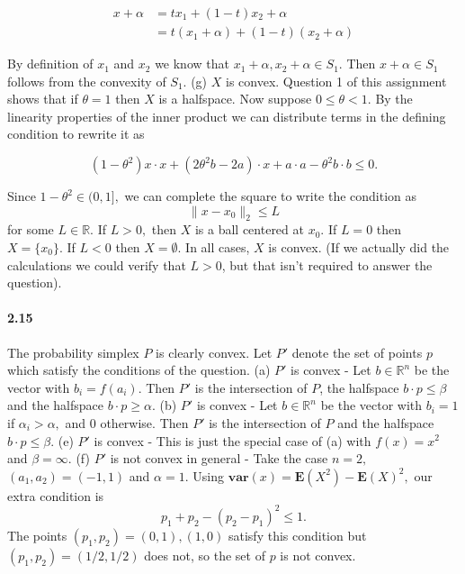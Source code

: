 \documentclass[a4paper,12pt]{article}
\begin{document}
\begin{align*}
 x + \alpha &= tx_1 + (1-t)x_2 + \alpha \\
 &= t(x_1+\alpha) + (1-t)(x_2+\alpha) 
\end{align*}

By definition of $x_1$ and $x_2$ we know that $x_1+\alpha, x_2+\alpha \in S_1.$ Then $x+\alpha \in S_1$ follows from the convexity of $S_1.$ 
\newline
(g) $X$ is convex. Question 1 of this assignment shows that if $\theta =1$ then $X$ is a halfspace. Now suppose $0\leq \theta < 1.$ By the linearity properties of the inner product we can distribute terms in the defining condition to rewrite it as 

$$ (1-\theta^2) x\cdot x + (2\theta^2b-2a)\cdot x + a\cdot a - \theta^2b\cdot b \leq 0.$$

Since $1-\theta^2 \in (0,1],$ we can complete the square to write the condition as $$\| x- x_0 \|_2 \leq L$$ for some $L\in \mathbb{R}.$ If $L>0,$ then $X$ is a ball centered at $x_0.$ If $L=0$ then $X = \{ x_0\}.$ If $L< 0$ then $X = \emptyset.$ In all cases, $X$ is convex. (If we actually did the calculations we could verify that $L>0$, but that isn't required to answer the question). 

\paragraph*{2.15}
The probability simplex $P$ is clearly convex. Let $P'$ denote the set of points $p$ which satisfy the conditions of the question.
\newline
(a) $P'$ is convex - Let $b\in\mathbb{R}^n$ be the vector with $b_i = f(a_i).$ Then $P'$ is the intersection of $P$, the halfspace $b\cdot p \leq \beta$ and the halfspace $b\cdot p \geq \alpha.$ 
\newline
(b) $P'$ is convex - Let $b\in \mathbb{R}^n$ be the vector with $b_i = 1$ if $\alpha_i > \alpha,$ and $0$ otherwise. Then $P'$ is the intersection of $P$ and the halfspace $b\cdot p \leq \beta.$
\newline
(e) $P'$ is convex - This is just the special case of (a) with $f(x) = x^2$ and $\beta = \infty.$ 
\newline
(f) $P'$ is not convex in general - Take the case $n=2,$ $(a_1,a_2) = (-1,1)$ and $\alpha = 1.$ Using $\mathbf{var}(x) = \mathbf{E}(X^2) - \mathbf{E}(X)^2,$ our extra condition is $$ p_1 + p_2 - (p_2-p_1)^2 \leq 1.$$ The points $(p_1,p_2) = (0,1), (1,0)$ satisfy this condition but $(p_1,p_2) = (1/2, 1/2)$ does not, so the set of $p$ is not convex. 
\end{document}
